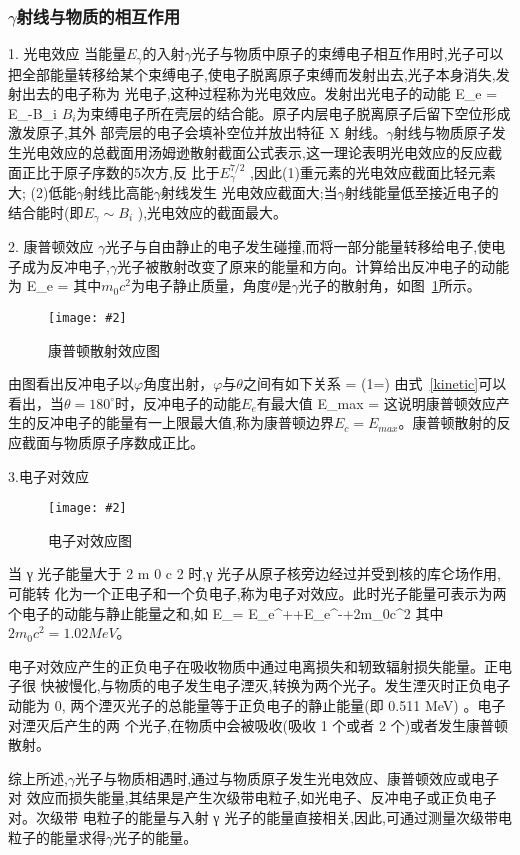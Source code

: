 \documentclass[11pt,a4paper]{ctexart}
\newcommand{\cpic}[2]{
\begin{center}
\texttt{[image: \#2]}
\end{center}
}
\newcommand{\cpicn}[3]
{
\begin{figure}[H]
\cpic{#1}{#2}
\caption{\color{red}#3\label{#2}}
\end{figure}
}
\begin{document}
\subsubsection{$\gamma$射线与物质的相互作用}
1. 光电效应
当能量$E_{\gamma}$的入射$\gamma$光子与物质中原子的束缚电子相互作用时,光子可以把全部能量转移给某个束缚电子,使电子脱离原子束缚而发射出去,光子本身消失,发射出去的电子称为
光电子,这种过程称为光电效应。发射出光电子的动能
\beq
E_e = E_{\gamma}-B_i
\eeq
$B_i$为束缚电子所在壳层的结合能。原子内层电子脱离原子后留下空位形成激发原子,其外
部壳层的电子会填补空位并放出特征 X 射线。$\gamma$射线与物质原子发生光电效应的总截面用汤姆逊散射截面公式表示,这一理论表明光电效应的反应截面正比于原子序数的5次方,反
比于$E_{\gamma}^{7/2}$ ,因此(1)重元素的光电效应截面比轻元素大;
(2)低能$\gamma$射线比高能$\gamma$射线发生
光电效应截面大;当$\gamma$射线能量低至接近电子的结合能时(即$E_\gamma \sim B_i$ ),光电效应的截面最大。

2. 康普顿效应
$\gamma$光子与自由静止的电子发生碰撞,而将一部分能量转移给电子,使电子成为反冲电子,$\gamma$光子被散射改变了原来的能量和方向。计算给出反冲电子的动能为
\beq\label{kinetic}
E_e = 
\eeq
其中$m_0c^2$为电子静止质量，角度$\theta$是$\gamma$光子的散射角，如图~\ref{t2}所示。
\cpicn{0.6}{t2}{康普顿散射效应图}
由图看出反冲电子以$\varphi$角度出射，$\varphi$与$\theta$之间有如下关系
\beq
\cot \varphi = \left(1=\right)\tan{}
\eeq
由式~\ref{kinetic}可以看出，当$\theta = 180^{\circ}$时，反冲电子的动能$E_e$有最大值
\beq
E_{max} = 
\eeq
这说明康普顿效应产生的反冲电子的能量有一上限最大值,称为康普顿边界$E_c = E_{max}$。康普顿散射的反应截面与物质原子序数成正比。

3.电子对效应
\cpicn{0.4}{t3}{电子对效应图}
当 γ 光子能量大于 2 m 0 c 2 时,γ 光子从原子核旁边经过并受到核的库仑场作用,可能转
化为一个正电子和一个负电子,称为电子对效应。此时光子能量可表示为两个电子的动能与静止能量之和,如
\beq
E_\gamma = E_e^{+}+E_e^{-}+2m_0c^2
\eeq
其中$2m_0c^2 = 1.02MeV$。

电子对效应产生的正负电子在吸收物质中通过电离损失和轫致辐射损失能量。正电子很
快被慢化,与物质的电子发生电子湮灭,转换为两个光子。发生湮灭时正负电子动能为 0,
两个湮灭光子的总能量等于正负电子的静止能量(即 0.511 MeV)
。电子对湮灭后产生的两
个光子,在物质中会被吸收(吸收 1 个或者 2 个)或者发生康普顿散射。

综上所述,$\gamma$光子与物质相遇时,通过与物质原子发生光电效应、康普顿效应或电子对
效应而损失能量,其结果是产生次级带电粒子,如光电子、反冲电子或正负电子对。次级带
电粒子的能量与入射 γ 光子的能量直接相关,因此,可通过测量次级带电粒子的能量求得$\gamma$光子的能量。
\end{document}
